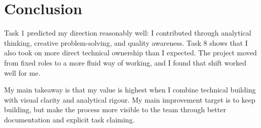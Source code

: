 \chapter{Conclusion}


\noindent Task 1 predicted my direction reasonably well: I contributed through analytical thinking, creative problem-solving, and quality awareness. Task 8 shows that I also took on more direct technical ownership than I expected. The project moved from fixed roles to a more fluid way of working, and I found that shift worked well for me.


\noindent My main takeaway is that my value is highest when I combine technical building with visual clarity and analytical rigour. My main improvement target is to keep building, but make the process more visible to the team through better documentation and explicit task claiming.
